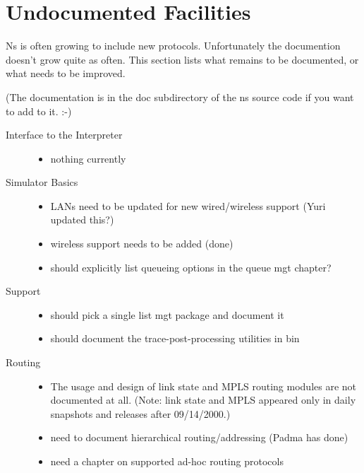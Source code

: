 
\chapter{Undocumented Facilities}

Ns is often growing to include new protocols.
Unfortunately the documention doesn't grow quite as often.
This section lists what remains to be documented,
  or what needs to be improved.

(The documentation is in the doc subdirectory of the ns source code
  if you want to add to it. :-)

\begin{description}
\item[Interface to the Interpreter]

        \begin{itemize}
        \item nothing currently
        \end{itemize}

\item[Simulator Basics]

        \begin{itemize}
        \item LANs need to be updated for new wired/wireless support
                (Yuri updated this?)
        \item wireless support needs to be added
                (done)
        \item should explicitly list queueing options in the queue mgt chapter?
        \end{itemize}

\item[Support]

        \begin{itemize}
        \item should pick a single list mgt package and document it
        \item should document the trace-post-processing utilities in bin
        \end{itemize}

\item[Routing]

  \begin{itemize}
  \item The usage and design of link state and MPLS routing modules
    are not documented at all. (Note: link state and MPLS appeared only in
    daily snapshots and releases after 09/14/2000.)
  \item need to document hierarchical routing/addressing
    (Padma has done)
  \item need a chapter on supported ad-hoc routing protocols
  \end{itemize}
  

\end{description}
